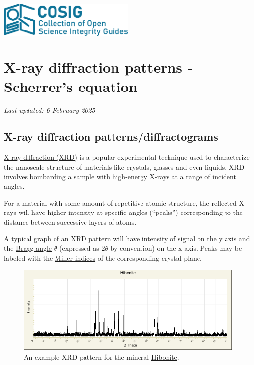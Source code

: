 \documentclass[letterpaper, 12pt]{article}
\begin{document}
\flushleft
\includegraphics[width=0.5\textwidth]{img/home/241017_final_logo_mockup.png}

\section*{X-ray diffraction patterns - Scherrer's equation}
\textit{Last updated: 6 February 2025}

\subsection*{X-ray diffraction patterns/diffractograms}

\href{https://web.pdx.edu/~pmoeck/phy381/Topic5a-XRD.pdf}{X-ray diffraction (XRD)} is a popular experimental technique used to characterize the nanoscale structure of materials like crystals, glasses and even liquids. XRD involves bombarding a sample with high-energy X-rays at a range of incident angles.

For a material with some amount of repetitive atomic structure, the reflected X-rays will have higher intensity at specific angles (``peaks'') corresponding to the distance between successive layers of atoms.

A typical graph of an XRD pattern will have intensity of signal on the y axis and the \href{https://en.wikipedia.org/wiki/Bragg%27s_law}{Bragg angle} $\theta$
(expressed as $2\theta$ by convention) on the x axis. Peaks may be labeled with the \href{https://chem.libretexts.org/Courses/Lafayette_College/CHEM_212_213%3A_Inorganic_Chemistry_(Nataro)/03%3A_Solid_state/3.10%3A_Miller_Indices_(hkl)}{Miller indices} of the corresponding crystal plane.

\begin{figure}[h!tbp]
    \includegraphics[width=\textwidth]{img/xrd/powder__2857__1486.png}
    \caption*{An example XRD pattern for the mineral \href{https://rruff.info/R061069}{Hibonite}.}
\end{figure}
\end{document}
